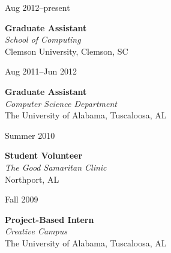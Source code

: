 \documentclass[11pt]{simplecv}
\newcommand{\stitle}{\textbf}
\newcommand{\splace}{\textit}
\newif\ifcv
\begin{document}
\begin{topic}

\item[Aug 2012--present] {
  \stitle{Graduate Assistant} \\
  \splace{School of Computing} \\
  Clemson University, Clemson, SC

\ifcv
  \begin{itemize}
    \item Maintained and developed software for School of Computing Linux systems
    \item Led lab and graded for an intermediate programming course.
  \end{itemize}
\fi
}

\item[Aug 2011--Jun 2012] {
  \stitle{Graduate Assistant} \\
  \splace{Computer Science Department} \\
  The University of Alabama, Tuscaloosa, AL

\ifcv
  \begin{itemize}
    \item Research in robotics software/middleware
    \item Lectured and graded for undergraduate data structures/algorithms course.
    \item Graded for undergraduate/graduate algorithms course.
    \item Lectured and graded for Programming II course.
  \end{itemize}
\fi
}

\item[Summer 2010] {
	\stitle{Student Volunteer} \\
	\splace{The Good Samaritan Clinic} \\
	Northport, AL

\ifcv
	\begin{itemize}
		\item Performed triage procedures for incoming patients.
	\end{itemize}
\fi
}

\item [Fall 2009] {
	\stitle{Project-Based Intern} \\
	\splace{Creative Campus} \\
	The University of Alabama, Tuscaloosa, AL
	
\ifcv
	\begin{itemize}
		\item Organized weeklong game development workshop.
	\end{itemize}
\fi
}



\end{topic}
\end{document}
